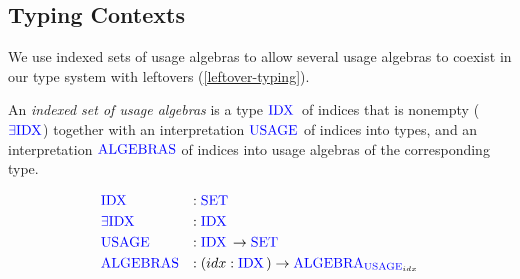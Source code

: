 \documentclass[runningheads]{llncs}
\newcommand{\type}[1]{\textcolor{blue}{\operatorname{#1}}}
\newcommand{\Set}{\type{SET}}
\newcommand{\Idx}{\type{IDX}\,}
\newcommand{\Usage}{\type{USAGE}}
\newcommand{\Algebra}{\type{ALGEBRA}}
\begin{document}
\subsection{Typing Contexts}
\label{contexts}

We use indexed sets of usage algebras to allow several usage algebras to coexist in our type system with leftovers (\autoref{leftover-typing}).
\begin{nidefinition}
  An \emph{indexed set of usage algebras} is a type $\Idx$ of indices that is nonempty ($\type{\exists IDX}$) together with an interpretation $\Usage$ of indices into types, and an interpretation $\type{ALGEBRAS}$ of indices into usage algebras of the corresponding type.

  \begin{equation*}
    \begin{aligned}
      &\Idx               &:{} &\Set \\
      &\type{\exists IDX} &:{} &\Idx \\
      &\Usage             &:{} &\Idx \to \Set \\
      &\type{ALGEBRAS}    &:{} &(idx : \Idx) \to \Algebra_{\Usage_{idx}}
    \end{aligned}
  \end{equation*}
\end{nidefinition}
\end{document}
